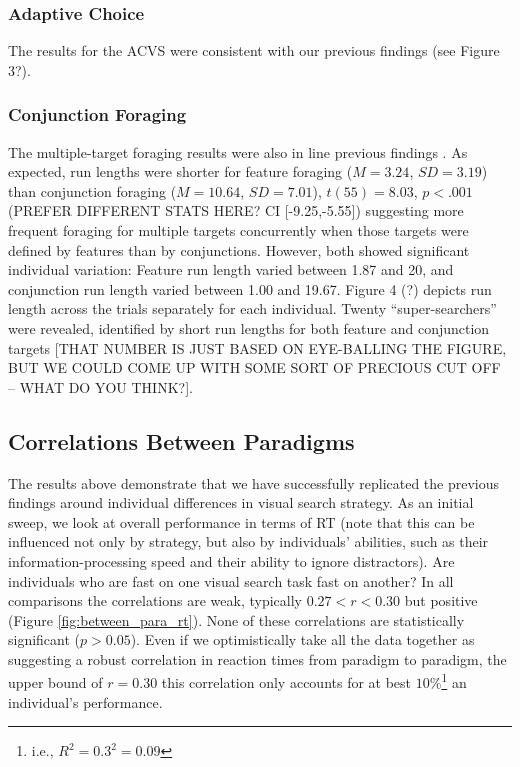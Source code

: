 \documentclass[]{rsos}%
\begin{document}
\subsubsection{Adaptive Choice}

The results for the ACVS were consistent with our previous findings \cite{irons-leber2016,irons-leber2018} (see Figure 3?). %

\subsubsection{Conjunction Foraging}

The multiple-target foraging results were also in line previous findings \cite{kristjansson2014,johannesson2016}. As expected, run lengths were shorter for feature foraging ($M = 3.24$, $SD = 3.19$) than conjunction foraging ($M = 10.64$, $SD = 7.01$), $t(55) = 8.03$, $p < .001$ (PREFER DIFFERENT STATS HERE? CI [-9.25,-5.55]) suggesting more frequent foraging for multiple targets concurrently when those targets were defined by features than by conjunctions. However, both showed significant individual variation: Feature run length varied between 1.87 and 20, and conjunction run length varied between 1.00 and 19.67. Figure 4 (?) depicts run length across the trials separately for each individual. Twenty ``super-searchers'' were revealed, identified by short run lengths for both feature and conjunction targets [THAT NUMBER IS JUST BASED ON EYE-BALLING THE FIGURE, BUT WE COULD COME UP WITH SOME SORT OF PRECIOUS CUT OFF – WHAT DO YOU THINK?]. 


\subsection{Correlations Between Paradigms}

The results above demonstrate that we have successfully replicated the previous findings around individual differences in visual search strategy. As an initial sweep, we look at overall performance in terms of RT (note that this can be influenced not only by strategy, but also by individuals' abilities, such as their information-processing speed and their ability to ignore distractors). Are individuals who are fast on one visual search task fast on another? In all comparisons the correlations are weak, typically $0.27 < r <0.30$ but positive (Figure \ref{fig:between_para_rt}). None of these correlations are statistically significant ($p>0.05$). Even if we optimistically take all the data together as suggesting a robust correlation in reaction times from paradigm to paradigm, the upper bound of $r=0.30$ this correlation only accounts for at best $10\%$\footnote{i.e., $R^2 = 0.3^2 = 0.09$} an individual's performance. 
\end{document}
